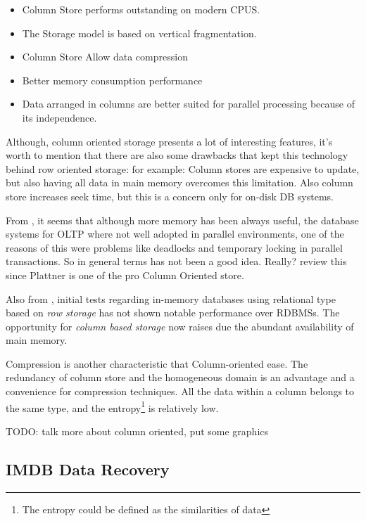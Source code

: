 \documentclass[10pt]{article} %
\begin{document}
\begin{itemize}
  \item Column Store performs outstanding on modern CPUS.

  \item The Storage model is based on vertical fragmentation.

  \item Column Store Allow data compression

  \item Better memory consumption performance

  \item Data arranged in columns are better suited for parallel processing because of its independence.

\end{itemize}
   
Although, column oriented storage presents a lot of interesting features, it's worth to mention that there are also some drawbacks that kept this technology behind row oriented storage: for example: Column stores are expensive to update, but also having all data in main memory overcomes this limitation. Also column store increases seek time, but this is a concern only for on-disk DB systems.

From \cite{Plattner}, it seems that although more memory has been always useful, the database systems for OLTP where not well adopted in parallel environments, one of the reasons of this were problems like deadlocks and temporary locking in parallel transactions. So in general terms has not been a good idea. Really? review this since Plattner is one of the pro Column Oriented store.

Also from \cite{Plattner}, initial tests regarding in-memory databases using relational type based on \emph{ row storage } has not shown notable performance over RDBMSs. The opportunity for \emph{column based storage} now raises due the abundant availability of main memory. 

Compression is another characteristic that Column-oriented ease. The redundancy of column store and the homogeneous domain is an advantage and a convenience for compression techniques. All the data within a column belongs to the same type, and the entropy\footnote{The entropy could be defined as the similarities of data} is relatively low. 

TODO: talk more about column oriented, put some graphics

\subsection{IMDB Data Recovery}
\end{document}
